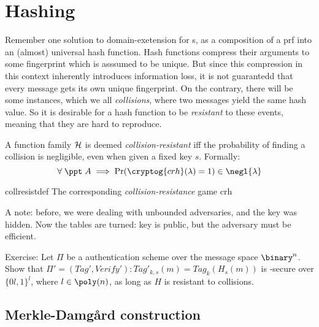 \section{Hashing}

Remember one solution to domain-exetension for \prf{}s, as a composition of a prf into an (almost) universal hash function. Hash functions compress their arguments to some fingerprint which is asssumed to be unique. But since this compression in this context inherently introduces information loss, it is not guarantedd that every message gets its own unique fingerprint. On the contrary, there will be some instances, which we all \emph{collisions}, where two messages yield the same hash value. So it is desirable for a hash function to be \emph{resistant} to these events, meaning that they are hard to reproduce.

\begin{definition}
    A function family $\mathcal{H}$ is deemed \emph{collision-resistant} iff the probability of finding a collision is negligible, even when given a fixed key $s$. Formally:
    \[
        \forall\; \ppt\; A \implies \Pr(\cryptog{crh}(\lambda) = 1) \in \negl{\lambda} 
    \]

    \begin{cryptogame}
        {collresistdef}
        {The corresponding \emph{collision-resistance} game}
        {crh}


        
    \end{cryptogame}
\end{definition}

A note: before, we were dealing with unbounded adversaries, and the key was hidden. Now the tables are turned: key is public, but the adversary must be efficient.

Exercise: Let $\Pi$ be a \ufcma authentication scheme over the message space $\binary^n$. Show that $\Pi' = (Tag', Verify') : Tag'_{k, s}(m) = Tag_k(H_s(m))$ is \ufcma-secure over $\{0l, 1\}^l$, where $l \in \poly(n)$, as long as $H$ is resistant to collisions.

\subsection{Merkle-Damg\r{a}rd construction}

